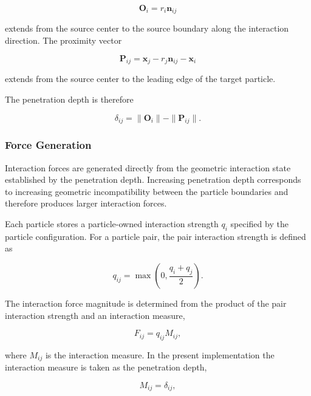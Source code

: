 \begin{equation}
\mathbf O_i
=
r_i\mathbf n_{ij}
\end{equation}

extends from the source center to the source
boundary along the interaction direction. The
proximity vector

\begin{equation}
\mathbf P_{ij}
=
\mathbf x_j-r_j\mathbf n_{ij}-\mathbf x_i
\end{equation}

extends from the source center to the leading edge
of the target particle.

The penetration depth is therefore

\begin{equation}
\delta_{ij}
=
\|\mathbf O_i\|
-
\|\mathbf P_{ij}\|.
\end{equation}

\subsubsection{Force Generation}

Interaction forces are generated directly from the
geometric interaction state established by the
penetration depth. Increasing penetration depth
corresponds to increasing geometric incompatibility
between the particle boundaries and therefore
produces larger interaction forces.

Each particle stores a particle-owned interaction
strength $q_i$ specified by the particle
configuration. For a particle pair, the pair
interaction strength is defined as

\begin{equation}
q_{ij}
=
\max\left(
0,
\frac{q_i+q_j}{2}
\right).
\end{equation}

The interaction force magnitude is determined from
the product of the pair interaction strength and an
interaction measure,

\begin{equation}
F_{ij}
=
q_{ij} M_{ij},
\end{equation}

where $M_{ij}$ is the interaction measure. In the
present implementation the interaction measure is
taken as the penetration depth,

\begin{equation}
M_{ij}
=
\delta_{ij},
\end{equation}

